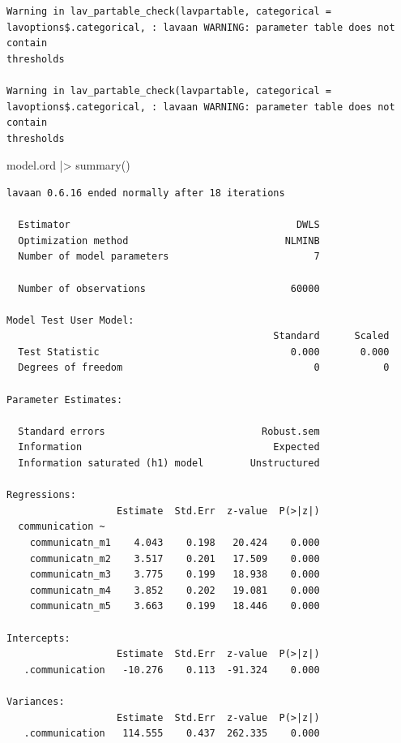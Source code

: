 \documentclass[
  letterpaper,
  DIV=11,
  numbers=noendperiod]{scrreprt}
\newenvironment{Shaded}{\begin{snugshade}}{\end{snugshade}}
\newcommand{\FunctionTok}[1]{\textcolor[rgb]{0.28,0.35,0.67}{#1}}
\newcommand{\NormalTok}[1]{\textcolor[rgb]{0.00,0.23,0.31}{#1}}
\newcommand{\SpecialCharTok}[1]{\textcolor[rgb]{0.37,0.37,0.37}{#1}}
\begin{document}
\begin{verbatim}
Warning in lav_partable_check(lavpartable, categorical =
lavoptions$.categorical, : lavaan WARNING: parameter table does not contain
thresholds

Warning in lav_partable_check(lavpartable, categorical =
lavoptions$.categorical, : lavaan WARNING: parameter table does not contain
thresholds
\end{verbatim}

\begin{Shaded}
\begin{Highlighting}[]
\NormalTok{model.ord }\SpecialCharTok{|\textgreater{}} \FunctionTok{summary}\NormalTok{()}
\end{Highlighting}
\end{Shaded}

\begin{verbatim}
lavaan 0.6.16 ended normally after 18 iterations

  Estimator                                       DWLS
  Optimization method                           NLMINB
  Number of model parameters                         7

  Number of observations                         60000

Model Test User Model:
                                              Standard      Scaled
  Test Statistic                                 0.000       0.000
  Degrees of freedom                                 0           0

Parameter Estimates:

  Standard errors                           Robust.sem
  Information                                 Expected
  Information saturated (h1) model        Unstructured

Regressions:
                   Estimate  Std.Err  z-value  P(>|z|)
  communication ~                                     
    communicatn_m1    4.043    0.198   20.424    0.000
    communicatn_m2    3.517    0.201   17.509    0.000
    communicatn_m3    3.775    0.199   18.938    0.000
    communicatn_m4    3.852    0.202   19.081    0.000
    communicatn_m5    3.663    0.199   18.446    0.000

Intercepts:
                   Estimate  Std.Err  z-value  P(>|z|)
   .communication   -10.276    0.113  -91.324    0.000

Variances:
                   Estimate  Std.Err  z-value  P(>|z|)
   .communication   114.555    0.437  262.335    0.000
\end{verbatim}
\end{document}
